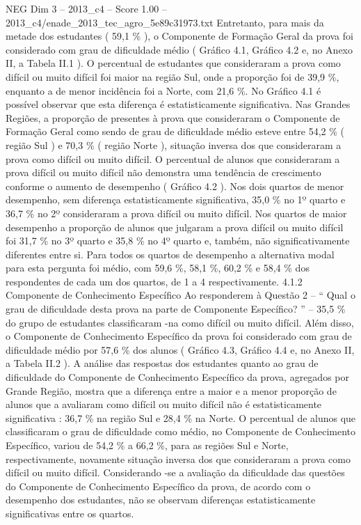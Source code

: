 \begin{textsample}{NEG Dim 3 – 2013\_c4 – Score 1.00 – 2013\_c4/enade\_2013\_tec\_agro\_5e89c31973.txt}
Entretanto, para mais da metade dos estudantes ( 59,1 \% ), o Componente de Formação Geral da prova foi considerado com grau de dificuldade médio ( Gráfico 4.1, Gráfico 4.2 e, no Anexo II, a Tabela II.1 ).
O percentual de estudantes que consideraram a prova como difícil ou muito difícil foi maior na região Sul, onde a proporção foi de 39,9 \%, enquanto a de menor incidência foi a Norte, com 21,6 \%.
No Gráfico 4.1 é possível observar que esta diferença é estatisticamente significativa.
Nas Grandes Regiões, a proporção de presentes à prova que consideraram o Componente de Formação Geral como sendo de grau de dificuldade médio esteve entre 54,2 \% ( região Sul ) e 70,3 \% ( região Norte ), situação inversa dos que consideraram a prova como difícil ou muito difícil.
O percentual de alunos que consideraram a prova difícil ou muito difícil não demonstra uma tendência de crescimento conforme o aumento de desempenho ( Gráfico 4.2 ).
Nos dois quartos de menor desempenho, sem diferença estatisticamente significativa, 35,0 \% no 1º quarto e 36,7 \% no 2º consideraram a prova difícil ou muito difícil.
Nos quartos de maior desempenho a proporção de alunos que julgaram a prova difícil ou muito difícil foi 31,7 \% no 3º quarto e 35,8 \% no 4º quarto e, também, não significativamente diferentes entre si.
Para todos os quartos de desempenho a alternativa modal para esta pergunta foi médio, com 59,6 \%, 58,1 \%, 60,2 \% e 58,4 \% dos respondentes de cada um dos quartos, de 1 a 4 respectivamente. 4.1.2 Componente de Conhecimento Específico Ao responderem à Questão 2 – “ Qual o grau de dificuldade desta prova na parte de Componente Específico? ” – 35,5 \% do grupo de estudantes classificaram -na como difícil ou muito difícil.
Além disso, o Componente de Conhecimento Específico da prova foi considerado com grau de dificuldade médio por 57,6 \% dos alunos ( Gráfico 4.3, Gráfico 4.4 e, no Anexo II, a Tabela II.2 ).
A análise das respostas dos estudantes quanto ao grau de dificuldade do Componente de Conhecimento Específico da prova, agregados por Grande Região, mostra que a diferença entre a maior e a menor proporção de alunos que a avaliaram como difícil ou muito difícil não é estatisticamente significativa : 36,7 \% na região Sul e 28,4 \% na Norte.
O percentual de alunos que classificaram o grau de dificuldade como médio, no Componente de Conhecimento Específico, variou de 54,2 \% a 66,2 \%, para as regiões Sul e Norte, respectivamente, novamente situação inversa dos que consideraram a prova como difícil ou muito difícil.
Considerando -se a avaliação da dificuldade das questões do Componente de Conhecimento Específico da prova, de acordo com o desempenho dos estudantes, não se observam diferenças estatisticamente significativas entre os quartos.

\end{textsample}
